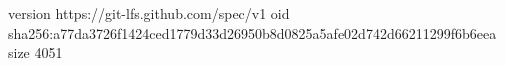 version https://git-lfs.github.com/spec/v1
oid sha256:a77da3726f1424ced1779d33d26950b8d0825a5afe02d742d66211299f6b6eea
size 4051
